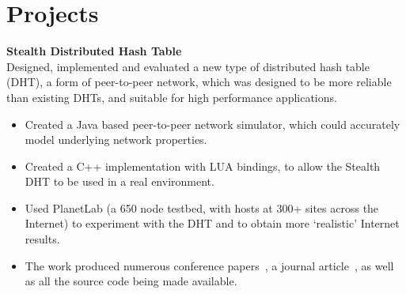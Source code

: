 \documentclass[a4paper,10pt]{article}
\begin{document}
% 
% 

\nocite{jakeman2009fna,faulkner2009epn,macquire2008acf,brampton2008cew,macquire2008asd,brampton2007cui,rai2007pmp,brampton2006sdh,macquire2006asd,macquire2006pas,brampton2005sdh}

\section{Projects}
 \textbf{Stealth Distributed Hash Table}\\
 Designed, implemented and evaluated a new type of distributed hash table (DHT), a form of peer-to-peer network, which was designed to be more reliable than existing DHTs, and suitable for high performance applications.

 \begin{itemize}
  \item Created a Java based peer-to-peer network simulator, which could accurately model underlying network properties.
  \item Created a C++ implementation with LUA bindings, to allow the Stealth DHT to be used in a real environment.
  \item Used PlanetLab (a 650 node testbed, with hosts at 300+ sites across the Internet) to experiment with the DHT and to obtain more `realistic' Internet results.
  \item The work produced numerous conference papers~\cite{rai2007pmp, brampton2006sdh, macquire2006asd, macquire2006pas,  brampton2005sdh}, a journal article~\cite{macquire2008asd}, as well as all the source code being made available.
 \end{itemize}
\vspace{1em}
\end{document}

